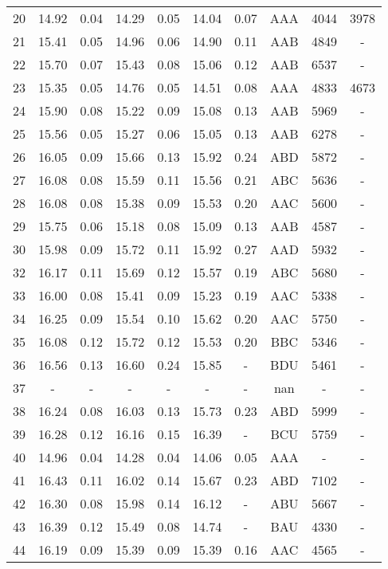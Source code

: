 \begin{longtable}{cccccccccc}
 20 & 14.92 & 0.04 & 14.29 & 0.05 & 14.04 & 0.07 & AAA & 4044 & 3978\\
\rowcolor[gray]{0.9}  21 & 15.41 & 0.05 & 14.96 & 0.06 & 14.90 & 0.11 & AAB & 4849 & -\\
\rowcolor[gray]{0.9}  22 & 15.70 & 0.07 & 15.43 & 0.08 & 15.06 & 0.12 & AAB & 6537 & -\\
\rowcolor[gray]{0.9}  23 & 15.35 & 0.05 & 14.76 & 0.05 & 14.51 & 0.08 & AAA & 4833 & 4673\\
 24 & 15.90 & 0.08 & 15.22 & 0.09 & 15.08 & 0.13 & AAB & 5969 & -\\
\rowcolor[gray]{0.9}  25 & 15.56 & 0.05 & 15.27 & 0.06 & 15.05 & 0.13 & AAB & 6278 & -\\
\rowcolor[gray]{0.9}  26 & 16.05 & 0.09 & 15.66 & 0.13 & 15.92 & 0.24 & ABD & 5872 & -\\
\rowcolor[gray]{0.9}  27 & 16.08 & 0.08 & 15.59 & 0.11 & 15.56 & 0.21 & ABC & 5636 & -\\
\rowcolor[gray]{0.9}  28 & 16.08 & 0.08 & 15.38 & 0.09 & 15.53 & 0.20 & AAC & 5600 & -\\
 29 & 15.75 & 0.06 & 15.18 & 0.08 & 15.09 & 0.13 & AAB & 4587 & -\\
 30 & 15.98 & 0.09 & 15.72 & 0.11 & 15.92 & 0.27 & AAD & 5932 & -\\
 32 & 16.17 & 0.11 & 15.69 & 0.12 & 15.57 & 0.19 & ABC & 5680 & -\\
 33 & 16.00 & 0.08 & 15.41 & 0.09 & 15.23 & 0.19 & AAC & 5338 & -\\
 34 & 16.25 & 0.09 & 15.54 & 0.10 & 15.62 & 0.20 & AAC & 5750 & -\\
 35 & 16.08 & 0.12 & 15.72 & 0.12 & 15.53 & 0.20 & BBC & 5346 & -\\
 36 & 16.56 & 0.13 & 16.60 & 0.24 & 15.85 & - & BDU & 5461 & -\\
 37 & - & - & - & - & - & - & nan & - & -\\
 38 & 16.24 & 0.08 & 16.03 & 0.13 & 15.73 & 0.23 & ABD & 5999 & -\\
 39 & 16.28 & 0.12 & 16.16 & 0.15 & 16.39 & - & BCU & 5759 & -\\
 40 & 14.96 & 0.04 & 14.28 & 0.04 & 14.06 & 0.05 & AAA & - & -\\
 41 & 16.43 & 0.11 & 16.02 & 0.14 & 15.67 & 0.23 & ABD & 7102 & -\\
 42 & 16.30 & 0.08 & 15.98 & 0.14 & 16.12 & - & ABU & 5667 & -\\
 43 & 16.39 & 0.12 & 15.49 & 0.08 & 14.74 & - & BAU & 4330 & -\\
 44 & 16.19 & 0.09 & 15.39 & 0.09 & 15.39 & 0.16 & AAC & 4565 & -\\

\end{longtable}
